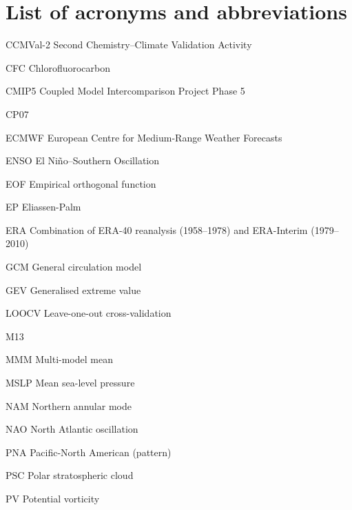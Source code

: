 \chapter*{List of acronyms and abbreviations}

\begin{description*}

\item[CCMVal-2] Second Chemistry--Climate Validation Activity 
\item[CFC] Chlorofluorocarbon
\item[CMIP5] Coupled Model Intercomparison Project Phase 5
\item[CP07] \citet{Charlton2007}
\item[ECMWF] European Centre for Medium-Range Weather Forecasts
\item[ENSO] El Ni\~no--Southern Oscillation
\item[EOF] Empirical orthogonal function
\item[EP] Eliassen-Palm
\item[ERA] Combination of ERA-40 reanalysis (1958--1978) and ERA-Interim (1979--2010)
\item[GCM] General circulation model
\item[GEV] Generalised extreme value
\item[LOOCV] Leave-one-out cross-validation
\item[M13] \citet{Mitchell2013}
\item[MMM] Multi-model mean
\item[MSLP] Mean sea-level pressure
\item[NAM] Northern annular mode
\item[NAO] North Atlantic oscillation
\item[PNA] Pacific-North American (pattern)
\item[PSC] Polar stratospheric cloud
\item[PV] Potential vorticity

\end{description*}

